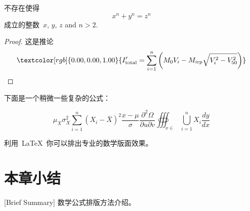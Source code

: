 \begin{theorem}[\heiti 费马]
  {\upshape\kaishu 不存在使得~
    \begin{equation}
      x^n+y^n=z^n
    \end{equation}
    成立的整数~$x$, $y$, $z$ and $n>2$. }
\end{theorem}

\begin{proof}
  {\upshape\kaishu 这是推论
    \begin{equation}
      \textcolor[rgb]{0.00,0.00,1.00}{
      I'_{{\rm{total}}} = \sum\limits_{i = 1}^n
      {\left( {M_0 V_i - M_{i{\rm{rp}}} \sqrt{V_i^2 - V_{50}^2}}\right)}}
    \end{equation}}
\end{proof}

下面是一个稍微一些复杂的公式：

\begin{equation}
  {\mu _X}\sigma _X^2\sum\limits_{i = 1}^n {{{({X_i} - \bar X)}^2}} \frac{{x - \mu }}{\sigma }\frac{{{\partial ^2}\Omega }}{{\partial u\partial v}}\oiiint\nolimits_{x \in }
  {\bigcup\limits_{i = 1}^n {{X_i}} \frac{{dy}}{{dx}}}
\end{equation}

利用~\LaTeX~你可以排出专业的数学版面效果。


\section*{本章小结}[Brief Summary]
数学公式排版方法介绍。

